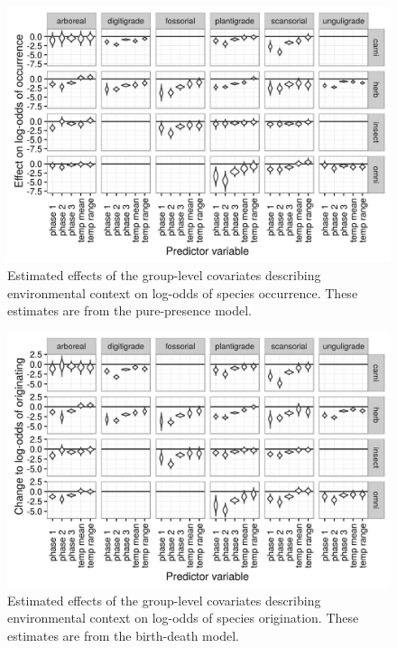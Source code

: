 \documentclass[12pt,letterpaper]{article}
\begin{document}
  
\begin{figure}[ht]
  \centering
  \includegraphics[width=\textwidth,height=0.4\textheight,keepaspectratio=true]{figure/group_on_ecotype}
  \caption[Effects of group-level covariates on log-odds of ecotype occurrence as estimated from the the pure-presence model]{Estimated effects of the group-level covariates describing environmental context on log-odds of species occurrence. These estimates are from the pure-presence model.} 
  \label{fig:group_pure_presence}
\end{figure}

\begin{figure}[ht]
  \centering
  \includegraphics[width=\textwidth,height=0.4\textheight,keepaspectratio=true]{figure/group_on_origin_bd}
  \caption[Effects of group-level covariates on log-odds of ecotype origination as estimated from the the birth-death model]{Estimated effects of the group-level covariates describing environmental context on log-odds of species origination. These estimates are from the birth-death model.}
  \label{fig:group_origin_bd}
\end{figure}
\end{document}
